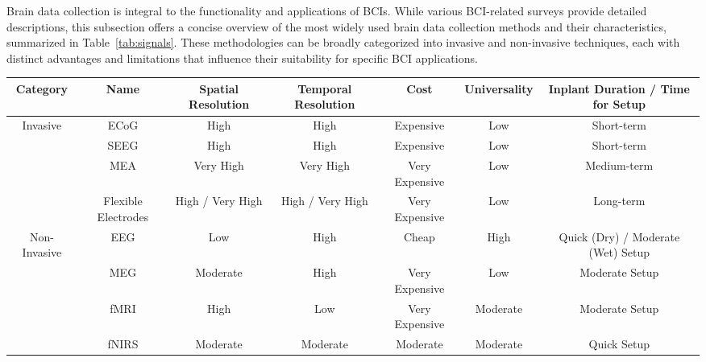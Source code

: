 \documentclass[journal]{IEEEtran}
\begin{document}
Brain data collection is integral to the functionality and applications of BCIs. While various BCI-related surveys provide detailed descriptions, this subsection offers a concise overview of the most widely used brain data collection methods and their characteristics, summarized in Table~\ref{tab:signals}. These methodologies can be broadly categorized into invasive and non-invasive techniques, each with distinct advantages and limitations that influence their suitability for specific BCI applications.

\begin{table*}[htpb]  \center
\caption{Summary of brain data collection devices and their data characteristics.}  \label{tab:signals}
\begin{tabular}{c|c|c|c|c|c|c}
\toprule
Category & Name & Spatial Resolution & Temporal Resolution & Cost & Universality & Inplant Duration / Time for Setup \\
\midrule
\multirow{4}{*}{Invasive} & ECoG & High & High & Expensive & Low & Short-term \\
& SEEG & High & High & Expensive & Low & Short-term \\
& MEA & Very High & Very High & Very Expensive & Low & Medium-term \\
& Flexible Electrodes & High / Very High & High / Very High & Very Expensive & Low & Long-term \\
\midrule
\multirow{4}{*}{Non-Invasive} & EEG & Low & High & Cheap & High & Quick (Dry) / Moderate (Wet) Setup \\
& MEG & Moderate & High & Very Expensive & Low & Moderate Setup \\
& fMRI & High & Low & Very Expensive & Moderate & Moderate Setup \\
& fNIRS & Moderate & Moderate & Moderate & Moderate & Quick Setup \\
\bottomrule
\end{tabular}
\end{table*}
\end{document}
